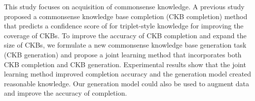 This study focuses on acquisition of commonsense knowledge. A previous study proposed a commonsense knowledge base completion (CKB completion) method that predicts a confidence score of for triplet-style knowledge for improving the coverage of CKBs. To improve the accuracy of CKB completion and expand the size of CKBs, we formulate a new commonsense knowledge base generation task (CKB generation) and propose a joint learning method that incorporates both CKB completion and CKB generation. Experimental results show that the joint learning method improved completion accuracy and the generation model created reasonable knowledge. Our generation model could also be used to augment data and improve the accuracy of completion.

